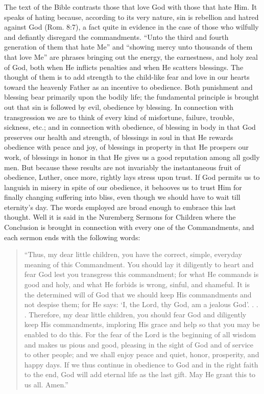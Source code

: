 The text of the Bible contrasts those that love God with those
that hate Him. It speaks of hating because, according to its very nature, sin is rebellion and hatred against God (Rom. 8:7), a fact quite in evidence in the case of those who wilfully and defiantly disregard the commandments. “Unto the third and fourth generation of them that hate Me” and “showing mercy unto thousands of them that love Me” are phrases bringing out the energy, the earnestness, and holy zeal of God, both when He inflicts penalties and when He scatters blessings. The thought of them is to add strength to the child-like fear and love in our hearts toward the heavenly Father as an incentive to obedience. Both punishment and blessing bear primarily upon the bodily life; the fundamental principle is brought out that sin is followed by evil, obedience by blessing. In connection with transgression we are to think of every kind of misfortune, failure, trouble, sickness, etc.; and in connection with obedience, of blessing in body in that God preserves our health and strength, of blessings in soul in that He rewards obedience with peace and joy, of blessings in property in that He prospers our work, of blessings in honor in that He gives us a good reputation among all godly men. But because these results are not invariably the instantaneous fruit of obedience, Luther, once more, rightly lays stress upon trust. If God permits us to languish in misery in spite of our obedience, it behooves us to trust Him for finally changing suffering into bliss, even though we should have to wait till eternity’s day. The words employed are broad enough to embrace this last thought. Well it is said in the Nuremberg Sermons for Children where the Conclusion is brought in connection with every one of the Commandments, and each sermon ends with the following words:

\begin{quote}
“Thus, my dear little children, you have the correct, simple, everyday meaning of this Commandment. You should lay it diligently to heart and fear God lest you transgress this commandment; for what He commands is good and holy, and what He forbids is wrong, sinful, and shameful. It is the determined will of God that we should keep His commandments and not despise them; for He says: ‘I, the Lord, thy God, am a jealous God’. . . . Therefore, my dear little children, you should fear God and diligently keep His commandments, imploring His grace and help so that you may be enabled to do this. For the fear of the Lord is the beginning of all wisdom and makes us pious and good, pleasing in the sight of God and of service to other people; and we shall enjoy peace and quiet, honor, prosperity, and happy days. If we thus continue in obedience to God and in the right faith to the end, God will add eternal life as the last gift. May He grant
this to us all. Amen.”
\end{quote}

